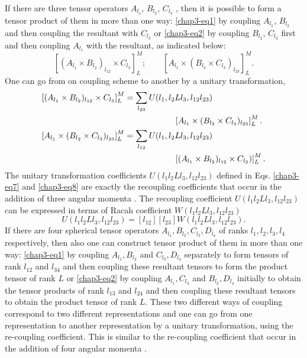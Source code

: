 If there are three tensor operators $A_{l_1}$, $B_{l_2}$, $C_{l_3}$ , then it is possible to form a tensor product of them in more than one way: \eqref{chap3-eq1} by coupling $A_{l_1}$, $B_{l_2}$ and then coupling the resultant with $C_{l_3}$ or \eqref{chap3-eq2} by coupling $B_{l_2}$, $C_{l_3}$ first and then coupling $A_{l_1}$ with the resultant, as indicated below:
\begin{equation}
\left[ (A_{l_1} \times B_{l_2})_{l_{12}} \times C_{l_3}\right]^M_L;  \qquad \left[ A_{l_1} \times (B_{l_2} \times C_{l_3})_{l_{23}}\right]^M_L. \label{chap3-eq6}
\end{equation}
One can go from on coupling scheme to another by a unitary transformation,
\begin{align}
\left[ (A_{l_1} \times B_{l_2})_{l_{12}} \times C_{l_3}\right]^M_L  & = \sum_{l_{23}} U (l_1, l_2 L l_3, l_{12} l_{23})\notag \\ 
& \qquad \qquad \qquad \left[A_{l_1} \times (B_{l_2} \times C_{l_3})_{l_{23}} \right]^M_L. \label{chap3-eq7}\\ 
\left[ A_{l_1} \times (B_{l_2} \times C_{l_3})_{l_{23}}\right]^M_L & = \sum_{l_{12}} U (l_1, l_2 L l_3, l_{12} l_{23}) \notag \\
& \qquad \qquad \qquad \left[(A_{l_1} \times B_{l_2})_{l_{12}} \times C_{l_3}) \right]^M_L. \label{chap3-eq8} 
\end{align}
The unitary transformation coefficients $U (l_1 l_2 L l_3, l_{12} l_{23})$ defined in Eqs. \eqref{chap3-eq7} and \eqref{chap3-eq8} are exactly the recoupling coefficients that occur in the addition of three angular momenta \cite{key11,key12}. The recoupling coefficient $U (l_1 l_2 Ll_3 , l_{12} l_{23})$ can be expressed in terms of Racah coefficient $W (l_1 l_2 Ll_3 , l_{12} l_{23})$ 
\begin{equation}
U (l_1 l_2 Ll_3 , l_{12} l_{23}) = [l_{12}][l_{23}] W (l_{1} l_2 Ll_3 , l_{12} l_{23}). \label{chap3-eq9}
\end{equation}
If there are four spherical tensor operators $A_{l_1}, B_{l_2}, C_{l_3}, D_{l_4}$ of ranks $l_1, l_2, l_3, l_4$ respectively, then also one can construct tensor product of them in more than one way: \eqref{chap3-eq1} by coupling $A_{l_1}, B_{l_2}$ and $C_{l_3}, D_{l_4}$ separately to form tensors of rank $l_{12}$ and $l_{34}$ and then coupling these resultant tensors to form the product tensor of rank $L$ or \eqref{chap3-eq2} by coupling $A_{l_1}, C_{l_3}$ and $B_{l_2}, D_{l_4}$ initially to obtain the tensor products of rank $l_{13}$ and $l_{24}$ and then coupling these resultant tensors to obtain the product tensor of rank $L$. These two different ways of coupling correspond to two different representations and one can go from one representation to another representation by a unitary transformation, using the re-coupling coefficient. This is similar to the re-coupling coefficient that occur in the addition of four angular momenta \cite{key11,key12}.

